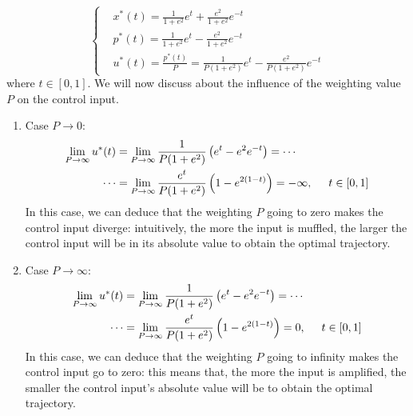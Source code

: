 \begin{equation}
    \begin{cases}
        &x^* (t) = \frac{1}{1 + e^2} e^t + \frac{e^2}{1+e^2} e^{-t}\\
        &p^* (t) = \frac{1}{1 + e^2} e^t - \frac{e^2}{1+e^2} e^{-t} \\
        &u^* (t) = \frac{p^*(t)}{P} = \frac{1}{P(1 + e^2)} e^t - \frac{e^2}{P(1+e^2)} e^{-t} 
    \end{cases}
\end{equation}
where $ t \in [0,1]$. We will now discuss about the influence of the weighting value $P$ on the control input.
\begin{enumerate}
    \item Case $P \to 0$:
    \begin{align}
         \lim_{P \to \infty} u^* (t) &= \lim_{P \to \infty} \frac{1}{P(1+e^2)} \left( e^t - e^2 e^{-t} \right)  = \cdots \\
         \cdots &= \lim_{P \to \infty} \frac{e^t}{P(1+e^2)} \left(1 - e^{2(1-t)} \right) = - \infty, \hspace{0.5cm} t \in [0,1]
    \end{align}
    In this case, we can deduce that the weighting $P$ going to zero makes the control input diverge: intuitively, the more the input is muffled, the larger the control input will be in its absolute value to obtain the optimal trajectory.
    \item Case $P \to \infty$:
    \begin{align}
         \lim_{P \to \infty} u^* (t) &= \lim_{P \to \infty} \frac{1}{P(1+e^2)} \left( e^t - e^2 e^{-t} \right)  = \cdots \\
         \cdots &= \lim_{P \to \infty} \frac{e^t}{P(1+e^2)} \left(1 - e^{2(1-t)} \right) = 0, \hspace{0.5cm} t \in [0,1]
    \end{align}
    In this case, we can deduce that the weighting $P$ going to infinity makes the control input go to zero: this means that, the more the input is amplified, the smaller the control input's absolute value will be to obtain the optimal trajectory.
\end{enumerate}
\QEDB

